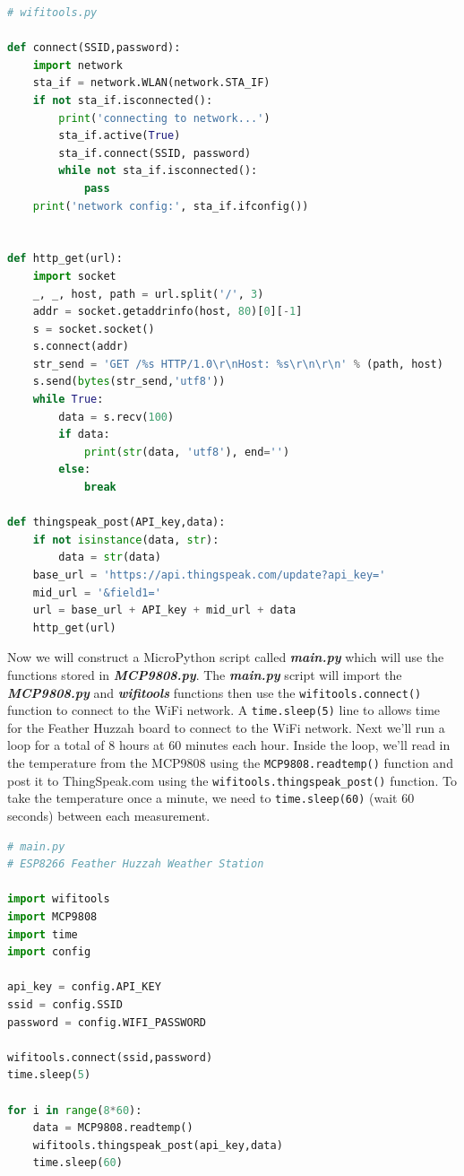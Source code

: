 \documentclass{book}
\begin{document}
\begin{lstlisting}[language=Python]
# wifitools.py

def connect(SSID,password):
    import network
    sta_if = network.WLAN(network.STA_IF)
    if not sta_if.isconnected():
        print('connecting to network...')
        sta_if.active(True)
        sta_if.connect(SSID, password)
        while not sta_if.isconnected():
            pass
    print('network config:', sta_if.ifconfig())

        
def http_get(url):
    import socket
    _, _, host, path = url.split('/', 3)
    addr = socket.getaddrinfo(host, 80)[0][-1]
    s = socket.socket()
    s.connect(addr)
    str_send = 'GET /%s HTTP/1.0\r\nHost: %s\r\n\r\n' % (path, host)
    s.send(bytes(str_send,'utf8'))
    while True:
        data = s.recv(100)
        if data:
            print(str(data, 'utf8'), end='')
        else:
            break

def thingspeak_post(API_key,data):
    if not isinstance(data, str):
        data = str(data)
    base_url = 'https://api.thingspeak.com/update?api_key='
    mid_url = '&field1='
    url = base_url + API_key + mid_url + data
    http_get(url)
\end{lstlisting}

Now we will construct a MicroPython script called
\textbf{\emph{main.py}} which will use the functions stored in
\textbf{\emph{MCP9808.py}}. The \textbf{\emph{main.py}} script will
import the \textbf{\emph{MCP9808.py}} and \textbf{\emph{wifitools}}
functions then use the \lstinline!wifitools.connect()! function to
connect to the WiFi network. A \lstinline!time.sleep(5)! line to allows
time for the Feather Huzzah board to connect to the WiFi network. Next
we'll run a loop for a total of 8 hours at 60 minutes each hour. Inside
the loop, we'll read in the temperature from the MCP9808 using the
\lstinline!MCP9808.readtemp()! function and post it to ThingSpeak.com
using the \lstinline!wifitools.thingspeak_post()! function. To take the
temperature once a minute, we need to \lstinline!time.sleep(60)! (wait
60 seconds) between each measurement.

\begin{lstlisting}[language=Python]
# main.py
# ESP8266 Feather Huzzah Weather Station

import wifitools
import MCP9808
import time
import config

api_key = config.API_KEY
ssid = config.SSID
password = config.WIFI_PASSWORD

wifitools.connect(ssid,password)
time.sleep(5)

for i in range(8*60):
    data = MCP9808.readtemp()
    wifitools.thingspeak_post(api_key,data)
    time.sleep(60)
\end{lstlisting}
    
\end{document}
